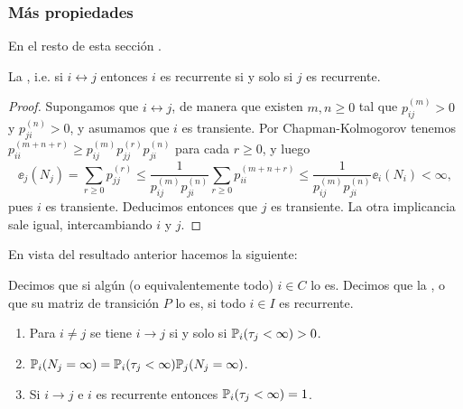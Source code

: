 \subsubsection{Más propiedades}

En el resto de esta sección .

\begin{prop}
La , i.e. si $i\leftrightarrow j$ entonces $i$ es recurrente si y solo si $j$ es recurrente.
\end{prop}

\begin{proof}
Supongamos que $i\leftrightarrow j$, de manera que existen $m,n\geq0$ tal que $p^{(m)}_{ij}>0$ y $p^{(n)}_{ji}>0$, y asumamos que $i$ es transiente.
Por Chapman-Kolmogorov tenemos $p^{(m+n+r)}_{ii}\geq p^{(m)}_{ij}p^{(r)}_{jj}p^{(n)}_{ji}$ para cada $r\geq0$, y luego
\[\ee_j(N_j)=\sum_{r\geq0}p^{(r)}_{jj}\leq\frac{1}{p^{(m)}_{ij}p^{(n)}_{ji}}\sum_{r\geq0}p^{(m+n+r)}_{ii}\leq\frac{1}{p^{(m)}_{ij}p^{(n)}_{ji}}\ee_i(N_i)<\infty,\]
pues $i$ es transiente.
Deducimos entonces que $j$ es transiente.
La otra implicancia sale igual, intercambiando $i$ y $j$.
\end{proof}

En vista del resultado anterior hacemos la siguiente:

\begin{defn}
Decimos que  si algún (o equivalentemente todo) $i\in C$ lo es.
Decimos que la , o que su matriz de transición $P$ lo es, si todo $i\in I$ es recurrente.
\end{defn}

\begin{prop}\label{prop:recprops}
\leavevmode
\begin{enumerate}[label=\uptext{(\roman*)}]
\item Para $i\neq j$ se tiene $i\rightarrow j$ si y solo si $\mathbb{P}_i(\tau_j<\infty)>0$.
\item $\mathbb{P}_i(N_j=\infty)=\mathbb{P}_i(\tau_j<\infty)\mathbb{P}_j(N_j=\infty)$.
\item Si $i\rightarrow j$ e $i$ es recurrente entonces $\mathbb{P}_i(\tau_j<\infty)=1$.
\end{enumerate}
\end{prop}

